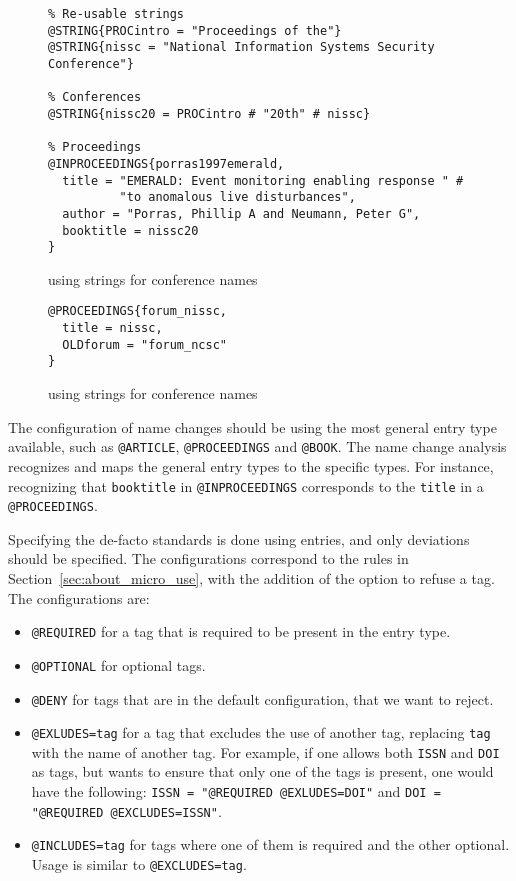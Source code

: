 \begin{figure}
  \centering
\begin{small}
\begin{verbatim}
% Re-usable strings
@STRING{PROCintro = "Proceedings of the"}
@STRING{nissc = "National Information Systems Security Conference"}

% Conferences
@STRING{nissc20 = PROCintro # "20th" # nissc}

% Proceedings
@INPROCEEDINGS{porras1997emerald,
  title = "EMERALD: Event monitoring enabling response " #
          "to anomalous live disturbances",
  author = "Porras, Phillip A and Neumann, Peter G",
  booktitle = nissc20
}
\end{verbatim}
\end{small}
  \caption{ using strings for conference names}
  \label{fig:analyzing_configuration_name_change_bib_file_strings}
\end{figure}

\begin{figure}
  \centering
\begin{verbatim}
@PROCEEDINGS{forum_nissc,
  title = nissc,
  OLDforum = "forum_ncsc"
}
\end{verbatim}
  \caption{ using strings for conference names}
  \label{fig:analyzing_configuration_name_change_config_file_strings}
\end{figure}

The configuration of name changes should be using the most general
entry type available, such as \texttt{@ARTICLE}, \texttt{@PROCEEDINGS}
and \texttt{@BOOK}.  The name change analysis recognizes and maps the
general entry types to the specific types.  For instance, recognizing
that \texttt{booktitle} in \texttt{@INPROCEEDINGS} corresponds to the
\texttt{title} in a \texttt{@PROCEEDINGS}.

Specifying the de-facto standards is done using {\bibtex} entries, and
only deviations should be specified.  The configurations correspond to
the rules in Section~\ref{sec:about_micro_use}, with the addition of
the option to refuse a tag.  The configurations are:

\begin{itemize}
\item \texttt{@REQUIRED} for a tag that is required to be present in
  the entry type.
\item \texttt{@OPTIONAL} for optional tags.
\item \texttt{@DENY} for tags that are in the default configuration,
  that we want to reject.
\item \texttt{@EXLUDES=tag} for a tag that excludes the use of another
  tag, replacing \texttt{tag} with the name of another tag.  For
  example, if one allows both \texttt{ISSN} and \texttt{DOI} as tags,
  but wants to ensure that only one of the tags is present, one would
  have the following: \texttt{ISSN = "@REQUIRED @EXLUDES=DOI"} and
  \texttt{DOI = "@REQUIRED @EXCLUDES=ISSN"}.
\item \texttt{@INCLUDES=tag} for tags where one of them is required
  and the other optional.  Usage is similar to \texttt{@EXCLUDES=tag}.
\end{itemize}

